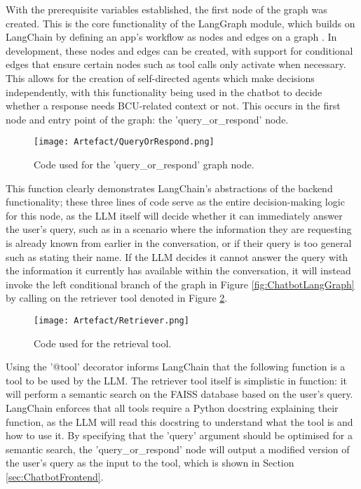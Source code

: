 \para With the prerequisite variables established, the first node of the graph was created. This is the core functionality of the LangGraph 
module, which builds on LangChain by defining an app's workflow 
as nodes and edges on a graph \autocite{langgraphLangGraph}. In development, these nodes and edges can be created, with support for conditional 
edges that ensure certain nodes such as tool calls only activate when necessary. This allows for the creation of self-directed agents which make 
decisions independently, with this functionality being used in the chatbot to decide whether a response needs BCU-related context or not. This 
occurs in the first node and entry point of the graph: the 'query\_or\_respond' node.

\begin{figure}[H]
    \centering
    \texttt{[image: Artefact/QueryOrRespond.png]}
    \caption{Code used for the 'query\_or\_respond' graph node. \label{fig:QueryOrRespond}}
\end{figure}

\noindent This function clearly demonstrates LangChain's abstractions of the backend functionality; these three lines of code
serve as the entire decision-making logic for this node, as the LLM itself will decide whether it can immediately answer the user's query,
such as in a scenario where the information they are requesting is already known from earlier in the conversation, or if their query is too 
general such as stating their name. If the LLM decides it cannot answer the query with the information it currently has available within 
the conversation, it will instead invoke the left conditional branch of the graph in Figure \ref{fig:ChatbotLangGraph} by calling on the 
retriever tool denoted in Figure \ref{fig:RetrieverTool}.

\begin{figure}[H]
    \centering
    \texttt{[image: Artefact/Retriever.png]}
    \caption{Code used for the retrieval tool. \label{fig:RetrieverTool}}
\end{figure}

\noindent Using the '@tool' decorator informs LangChain that the following function is a tool to be used by the LLM.
The retriever tool itself is simplistic 
in function: it will perform a semantic search on the FAISS database based on the user's query. LangChain enforces that all 
tools require a Python docstring explaining their function, as the LLM will read this docstring to understand what the tool 
is and how to use it. By specifying that the 'query' argument should be optimised for a semantic search, the 'query\_or\_respond'
node will output a modified version of the user's query as the input to the tool, which is shown in Section 
\ref{sec:ChatbotFrontend}. 

